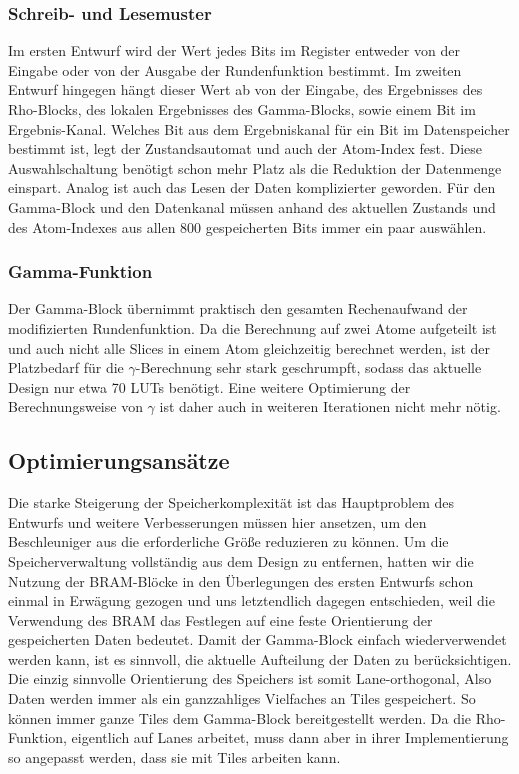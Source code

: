 \subsubsection{Schreib- und Lesemuster}
Im ersten Entwurf wird der Wert jedes Bits im Register entweder von der Eingabe oder von der Ausgabe der Rundenfunktion bestimmt.
Im zweiten Entwurf hingegen hängt dieser Wert ab von der Eingabe, des Ergebnisses des Rho-Blocks, des lokalen Ergebnisses des Gamma-Blocks, sowie einem Bit im Ergebnis-Kanal.
Welches Bit aus dem Ergebniskanal für ein Bit im Datenspeicher bestimmt ist, legt der Zustandsautomat und auch der Atom-Index fest.
Diese Auswahlschaltung benötigt schon mehr Platz als die Reduktion der Datenmenge einspart.
Analog ist auch das Lesen der Daten komplizierter geworden. Für den Gamma-Block und den Datenkanal müssen
anhand des aktuellen Zustands und des Atom-Indexes aus allen 800 gespeicherten Bits immer ein paar auswählen.

\subsubsection{Gamma-Funktion}
Der Gamma-Block übernimmt praktisch den gesamten Rechenaufwand der modifizierten Rundenfunktion. Da die Berechnung auf
zwei Atome aufgeteilt ist und auch nicht alle Slices in einem Atom gleichzeitig berechnet werden, ist der Platzbedarf für
die $\gamma$-Berechnung sehr stark geschrumpft, sodass das aktuelle Design nur etwa 70 LUTs benötigt.
Eine weitere Optimierung der Berechnungsweise von $\gamma$ ist daher auch in weiteren Iterationen nicht mehr nötig.

\subsection{Optimierungsansätze}
Die starke Steigerung der Speicherkomplexität ist das Hauptproblem des Entwurfs und weitere Verbesserungen müssen hier ansetzen,
um den Beschleuniger aus die erforderliche Größe reduzieren zu können. Um die Speicherverwaltung vollständig aus dem Design zu entfernen,
hatten wir die Nutzung der BRAM-Blöcke in den Überlegungen des ersten Entwurfs schon einmal in Erwägung gezogen und uns letztendlich dagegen entschieden,
weil die Verwendung des BRAM das Festlegen auf eine feste Orientierung der gespeicherten Daten bedeutet. Damit der Gamma-Block einfach wiederverwendet werden kann,
ist es sinnvoll, die aktuelle Aufteilung der Daten zu berücksichtigen. Die einzig sinnvolle Orientierung des Speichers ist somit Lane-orthogonal,
Also Daten werden immer als ein ganzzahliges Vielfaches an Tiles gespeichert. So können immer ganze Tiles dem Gamma-Block bereitgestellt werden.
Da die Rho-Funktion, eigentlich auf Lanes arbeitet, muss dann aber in ihrer Implementierung so angepasst werden, dass sie mit Tiles arbeiten kann.


